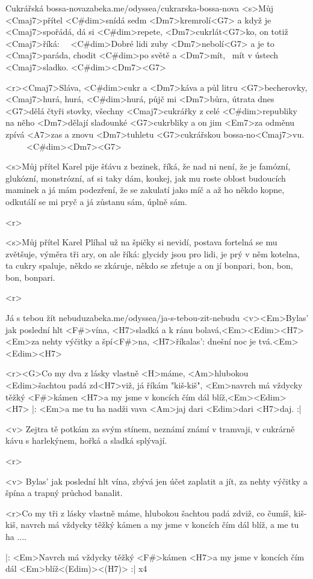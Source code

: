 \begin{song}{69}{Cukrářská bossa-nova}{zabeka.me/odyssea/cukrarska-bossa-nova}
	<s>Můj <Cmaj7>přítel <C#dim>snídá sedm <Dm7>kremrolí<G7>
	a když je <Cmaj7>spořádá, dá si <C#dim>repete,
	<Dm7>cukrlát<G7>ko,
	on totiž <Cmaj7>říká: \ \ <C#dim>Dobré lidi zuby <Dm7>nebolí<G7>
	a je to <Cmaj7>paráda, chodit <C#dim>po světě
	a <Dm7>mít, \ <G7>mít v ústech <Cmaj7>sladko. <C#dim><Dm7><G7>

	<r><Cmaj7>Sláva, <C#dim>cukr a <Dm7>káva a půl litru <G7>becherovky,
	<Cmaj7>hurá, hurá, <C#dim>hurá, půjč mi <Dm7>bůra, útrata dnes <G7>dělá čtyři stovky,
	všechny <Cmaj7>cukrářky z celé <C#dim>republiky
	na něho <Dm7>dělají slaďounké <G7>cukrbliky
	a on jim <Em7>za odměnu zpívá <A7>zas a znovu
	<Dm7>tuhletu <G7>cukrářskou bossa-no<Cmaj7>vu. \ \ \ \ \ <C#dim><Dm7><G7>

	<s>Můj přítel Karel pije šťávu z bezinek,
	říká, že nad ni není,
	že je famózní, glukózní, monstrózní, ať si taky dám,
	koukej, jak mu roste oblost budoucích maminek
	a já mám podezření,
	že se zakulatí jako míč
	a až ho někdo kopne, odkutálí se mi pryč
	a já zůstanu sám, úplně sám.

	<r>

	<s>Můj přítel Karel Plíhal už na špičky si nevidí,
	postava fortelná se mu zvětšuje,
	výměra tři ary,
	on ale říká: glycidy jsou pro lidi,
	je prý v něm kotelna, ta cukry spaluje,
	někdo se zkáruje, někdo se zfetuje
	a on jí bonpari, bon, bon, bon, bonpari.

	<r>
\end{song}
\begin{song}[Nerez]{70}{Já s tebou žít nebudu}{zabeka.me/odyssea/ja-s-tebou-zit-nebudu}
	<v><Em>Bylas' jak poslední hlt <F#>vína,
	<H7>sladká a k ránu bolavá,<Em><Edim><H7>
	<Em>za nehty výčitky a špí<F#>na,
	<H7>říkalas': dnešní noc je tvá.<Em><Edim><H7>

	<r><G>Co my dva z lásky vlastně <H>máme,
	<Am>hlubokou <Edim>šachtou padá zd<H7>viž, já říkám "kiš-kiš",
	<Em>navrch má vždycky těžký <F#>kámen
	<H7>a my jsme v koncích čím dál blíž,<Em><Edim><H7>
	|: <Em>a me tu ha nadži vava <Am>jaj dari <Edim>dari <H7>daj. :|

	<v> Zejtra tě potkám za svým stínem,
	neznámí známí v tramvaji,
	v cukrárně kávu s harlekýnem,
	hořká a sladká splývají.

	<r>

	<v> Bylas' jak poslední hlt vína,
	zbývá jen účet zaplatit a jít,
	za nehty výčitky a špína
	a trapný průchod banalit.

	<r>Co my tři z lásky vlastně máme,
	hlubokou šachtou padá zdviž, co čumíš, kiš-kiš,
	navrch má vždycky těžký kámen
	a my jsme v koncích čím dál blíž,
	a me tu ha ....

	|: <Em>Navrch má vždycky těžký <F#>kámen
	<H7>a my jsme v koncích čím dál <Em>blíž<(Edim)><(H7)> :| x4
\end{song}


